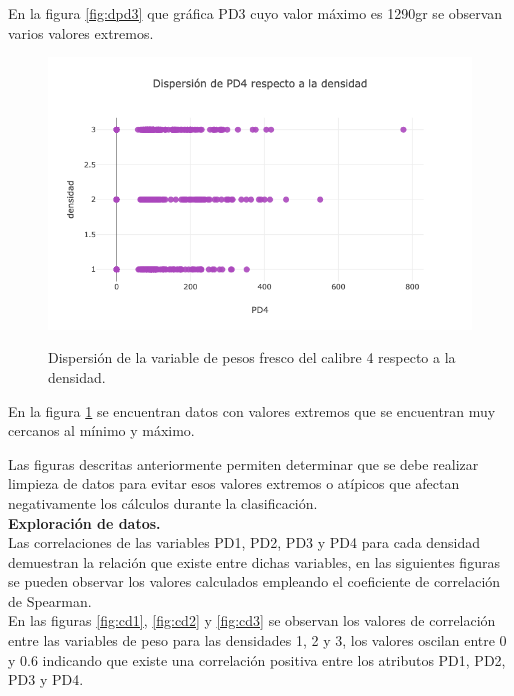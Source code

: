 En la figura \ref{fig:dpd3} que gráfica PD3 cuyo valor máximo es 1290gr se observan varios valores extremos.

\begin{figure}[h!]
	\caption{Dispersión de la variable de pesos fresco del calibre 4 respecto a la densidad.}
	\centering
	\includegraphics[scale=0.5]{d-pd4.png}
	\label{fig:dpd4}
\end{figure}

En la figura \ref{fig:dpd4} se encuentran datos con valores extremos que se encuentran muy cercanos al mínimo y máximo.

Las figuras descritas anteriormente permiten determinar que se debe realizar limpieza de datos para evitar esos valores extremos o atípicos que afectan negativamente los cálculos durante la clasificación.\\


\noindent
\textbf{Exploración de datos.}\\

Las correlaciones de las variables PD1, PD2, PD3 y PD4 para cada densidad demuestran la relación que existe entre dichas variables, en las siguientes figuras se pueden observar los valores calculados empleando el coeficiente de correlación de Spearman.\\

En las figuras \ref{fig:cd1}, \ref{fig:cd2} y \ref{fig:cd3} se observan los valores de correlación entre las variables de peso para las densidades 1, 2 y 3, los valores oscilan entre 0 y 0.6 indicando que existe una correlación positiva entre los atributos PD1, PD2, PD3 y PD4.\\\\\\\\\\\\\\\\

